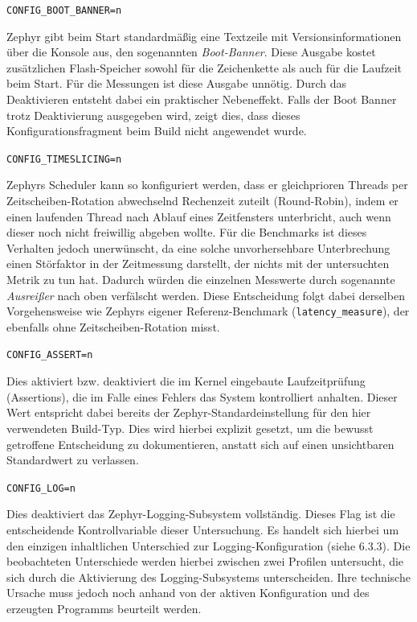 \lstinline[style=fileinline]|CONFIG_BOOT_BANNER=n|

Zephyr gibt beim Start standardm{\"a}{\ss}ig eine Textzeile mit Versionsinformationen {\"u}ber die Konsole aus, den sogenannten \emph{Boot-Banner}. Diese Ausgabe kostet zus{\"a}tzlichen Flash-Speicher sowohl f{\"u}r die Zeichenkette als auch f{\"u}r die Laufzeit beim Start. F{\"u}r die Messungen ist diese Ausgabe unn{\"o}tig. Durch das Deaktivieren entsteht dabei ein praktischer Nebeneffekt. Falls der Boot Banner trotz Deaktivierung ausgegeben wird, zeigt dies, dass dieses Konfigurationsfragment beim Build nicht angewendet wurde.

\lstinline[style=fileinline]|CONFIG_TIMESLICING=n|

Zephyrs Scheduler kann so konfiguriert werden, dass er gleichprioren Threads per Zeitscheiben-Rotation abwechselnd Rechenzeit zuteilt (Round-Robin), indem er einen laufenden Thread nach Ablauf eines Zeitfensters unterbricht, auch wenn dieser noch nicht freiwillig abgeben wollte. F{\"u}r die Benchmarks ist dieses Verhalten jedoch unerw{\"u}nscht, da eine solche unvorhersehbare Unterbrechung einen St{\"o}rfaktor in der Zeitmessung darstellt, der nichts mit der untersuchten Metrik zu tun hat. Dadurch w{\"u}rden die einzelnen Messwerte durch sogenannte\emph{ Ausrei{\ss}er} nach oben verf{\"a}lscht werden. Diese Entscheidung folgt dabei derselben Vorgehensweise wie Zephyrs eigener Referenz-Benchmark (\lstinline[style=fileinline]|latency_measure|), der ebenfalls ohne Zeitscheiben-Rotation misst.

\lstinline[style=fileinline]|CONFIG_ASSERT=n|

Dies aktiviert bzw. deaktiviert die im Kernel eingebaute Laufzeitpr{\"u}fung (Assertions), die im Falle eines Fehlers das System kontrolliert anhalten. Dieser Wert entspricht dabei bereits der Zephyr-Standardeinstellung f{\"u}r den hier verwendeten Build-Typ. Dies wird hierbei explizit gesetzt, um die bewusst getroffene Entscheidung zu dokumentieren, anstatt sich auf einen unsichtbaren Standardwert zu verlassen.

\lstinline[style=fileinline]|CONFIG_LOG=n|

Dies deaktiviert das Zephyr-Logging-Subsystem vollst{\"a}ndig. Dieses Flag ist die entscheidende Kontrollvariable dieser Untersuchung. Es handelt sich hierbei um den einzigen inhaltlichen Unterschied zur Logging-Konfiguration (siehe 6.3.3). Die beobachteten Unterschiede werden hierbei zwischen zwei Profilen untersucht, die sich durch die Aktivierung des Logging-Subsystems unterscheiden. Ihre technische Ursache muss jedoch noch anhand von der aktiven Konfiguration und des erzeugten Programms beurteilt werden.

